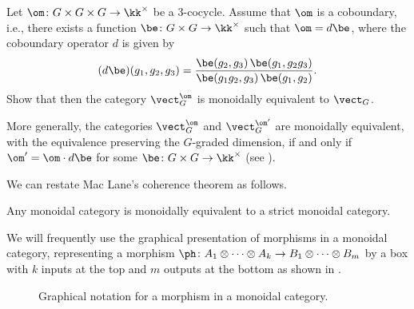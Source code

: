 \begin{exercise}\label{ec:twisted-group-cat}
  Let $\om\colon G\times G\times G\to \kk^\times$ be a 3-cocycle. Assume that
  $\om$ is a coboundary, i.e., there exists a function $\be\colon G\times
  G\to \kk^\times$ such that $\om=d\be$, where the coboundary operator $d$
  is given by
  $$
    (d\be)(g_1, g_2, g_3)=
    \frac{\be(g_2, g_3)\,\be(g_1, g_2g_3)}{\be(g_1g_2, g_3)\,\be(g_1, g_2)}.
  $$
  Show that then the category $\vect_G^\om$ is monoidally equivalent to
  $\vect_G$.

  More generally, the categories $\vect_G^\om$ and $\vect_G^{\om'}$ are
  monoidally equivalent, with the equivalence preserving the $G$-graded
  dimension, if and only if $\om'=\om \cdot d\be$ for some
  $\be\colon G\times G\to \kk^\times$ (see \cite[Section
  2.6]{etingof-fusion}).
\end{exercise}



We can restate Mac Lane's coherence theorem as follows.
\begin{theorem}\label{t:strictify}
  Any monoidal category is monoidally equivalent to a strict monoidal category.
\end{theorem}




\begin{convention}\label{c:graphical-monoidal}
  We will frequently use the graphical presentation of morphisms
  in a monoidal category, representing a morphism
  $\ph \colon A_1\otimes \dots \otimes A_k\to B_1\otimes\dots \otimes B_m$
  by a box with $k$ inputs at the top and $m$ outputs at the bottom as shown in
  .
\begin{figure}[h]
  \centering
  \caption{Graphical notation for a morphism in a monoidal category.}
  \label{f:graphical-morphism}
\end{figure}
\end{convention}







